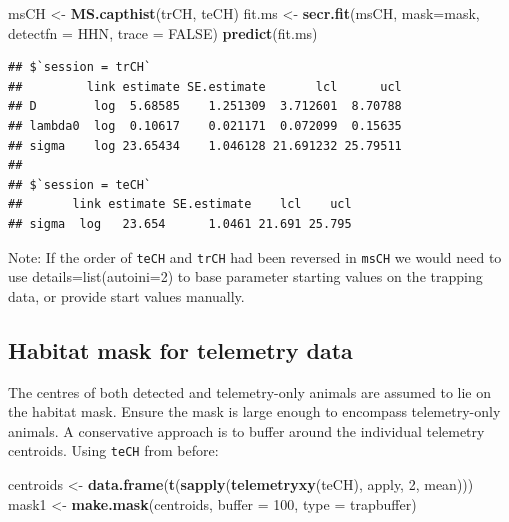 \documentclass[
]{book}
\newenvironment{Shaded}{\begin{snugshade}}{\end{snugshade}}
\newcommand{\AttributeTok}[1]{\textcolor[rgb]{0.13,0.29,0.53}{#1}}
\newcommand{\ConstantTok}[1]{\textcolor[rgb]{0.56,0.35,0.01}{#1}}
\newcommand{\DecValTok}[1]{\textcolor[rgb]{0.00,0.00,0.81}{#1}}
\newcommand{\FunctionTok}[1]{\textcolor[rgb]{0.13,0.29,0.53}{\textbf{#1}}}
\newcommand{\NormalTok}[1]{#1}
\newcommand{\OtherTok}[1]{\textcolor[rgb]{0.56,0.35,0.01}{#1}}
\newcommand{\StringTok}[1]{\textcolor[rgb]{0.31,0.60,0.02}{#1}}
\begin{document}
\begin{Shaded}
\begin{Highlighting}[]
\NormalTok{msCH }\OtherTok{\textless{}{-}} \FunctionTok{MS.capthist}\NormalTok{(trCH, teCH)}
\NormalTok{fit.ms }\OtherTok{\textless{}{-}} \FunctionTok{secr.fit}\NormalTok{(msCH, }\AttributeTok{mask=}\NormalTok{mask, }\AttributeTok{detectfn =} \StringTok{\textquotesingle{}HHN\textquotesingle{}}\NormalTok{, }
                   \AttributeTok{trace =} \ConstantTok{FALSE}\NormalTok{)}
\FunctionTok{predict}\NormalTok{(fit.ms)}
\end{Highlighting}
\end{Shaded}

\begin{verbatim}
## $`session = trCH`
##         link estimate SE.estimate       lcl      ucl
## D        log  5.68585    1.251309  3.712601  8.70788
## lambda0  log  0.10617    0.021171  0.072099  0.15635
## sigma    log 23.65434    1.046128 21.691232 25.79511
## 
## $`session = teCH`
##       link estimate SE.estimate    lcl    ucl
## sigma  log   23.654      1.0461 21.691 25.795
\end{verbatim}

Note: If the order of \texttt{teCH} and \texttt{trCH} had been reversed in \texttt{msCH} we would need to use details=list(autoini=2) to base parameter starting values on the trapping data, or provide start values manually.

\subsection{Habitat mask for telemetry data}\label{habitatmask}

The centres of both detected and telemetry-only animals are assumed to lie on the habitat mask. Ensure the mask is large enough to encompass telemetry-only animals. A conservative approach is to buffer around the individual telemetry centroids. Using \texttt{teCH} from before:

\begin{Shaded}
\begin{Highlighting}[]
\NormalTok{centroids }\OtherTok{\textless{}{-}} \FunctionTok{data.frame}\NormalTok{(}\FunctionTok{t}\NormalTok{(}\FunctionTok{sapply}\NormalTok{(}\FunctionTok{telemetryxy}\NormalTok{(teCH), }
\NormalTok{    apply, }\DecValTok{2}\NormalTok{, mean)))}
\NormalTok{mask1 }\OtherTok{\textless{}{-}} \FunctionTok{make.mask}\NormalTok{(centroids, }\AttributeTok{buffer =} \DecValTok{100}\NormalTok{, }\AttributeTok{type =} \StringTok{\textquotesingle{}trapbuffer\textquotesingle{}}\NormalTok{)}
\end{Highlighting}
\end{Shaded}
\end{document}
